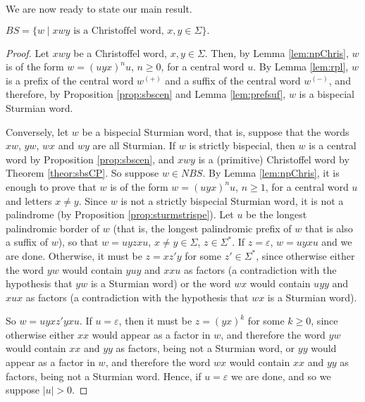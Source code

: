 \documentclass{llncs}
\newcommand{\BS}{\textit{BS}}
\newcommand{\WBS}{\textit{NBS}}
\renewcommand{\epsilon}{\varepsilon}
\begin{document}
We are now ready to state our main result.

\begin{theorem}\label{theor:main}
$\BS=\{w\mid xwy \mbox{ is a Christoffel word, $x,y\in \Sigma\}$}.$
\end{theorem}

\begin{proof}
 Let $xwy$ be a Christoffel word, $x,y\in \Sigma$.  Then, by Lemma \ref{lem:npChris}, $w$ is of the form $w=(uyx)^{n}u$, $n\ge 0$, for a central word $u$. By Lemma \ref{lem:rpl}, $w$ is a prefix of the central word $w^{(+)}$ and a suffix of the central word $w^{(-)}$, and therefore, by Proposition \ref{prop:sbscen} and Lemma \ref{lem:prefsuf}, $w$ is a bispecial Sturmian word.
 
 Conversely, let $w$ be a bispecial Sturmian word, that is, suppose that the words $xw$, $yw$, $wx$ and $wy$ are all Sturmian. If $w$ is strictly bispecial, then $w$ is a central word by Proposition \ref{prop:sbscen}, and $xwy$ is a (primitive) Christoffel word by Theorem \ref{theor:sbsCP}. So suppose $w\in \WBS$. By Lemma \ref{lem:npChris}, it is enough to prove that $w$ is of the form $w=(uyx)^{n}u$, $n\ge 1$, for a central word $u$ and letters $x\neq y$. Since $w$ is not a strictly bispecial Sturmian word, it is not a palindrome (by Proposition \ref{prop:sturmstrispe}). Let $u$ be the longest palindromic border of $w$ (that is, the longest palindromic prefix of $w$ that is also a suffix of $w$), so that $w=uyzxu$, $x\neq y\in \Sigma$, $z\in \Sigma^{*}$. If $z=\varepsilon$, $w=uyxu$ and we are done. Otherwise, it must be $z=xz'y$ for some $z'\in \Sigma^{*}$, since otherwise either the word $yw$ would contain $yuy$ and $xxu$ as factors (a contradiction with the hypothesis that $yw$ is a Sturmian word) or the word $wx$ would contain $uyy$ and $xux$ as factors (a contradiction with the hypothesis that $wx$ is a Sturmian word). 
 
So $w=uyxz'yxu$. If $u=\varepsilon$, then it must be $z=(yx)^{k}$ for some $k\ge 0$, since otherwise either  $xx$ would appear as a factor in $w$, and therefore the word $yw$ would contain $xx$ and $yy$ as factors, being not a Sturmian word, or $yy$ would appear as a factor in $w$, and therefore the word $wx$ would contain $xx$ and $yy$ as factors, being not a Sturmian word. Hence, if $u=\epsilon$ we are done, and so we suppose $|u|>0$. 
 

\end{proof}
\end{document}
